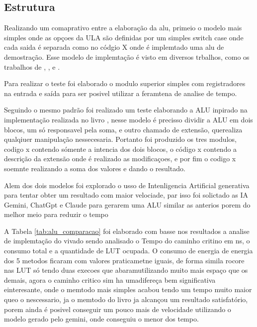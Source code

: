 \subsection{Estrutura}
\label{sub:estrutura}

Realizando um comaprativo entre a elaboração da alu, primeio o modelo mais simples onde as opçoes da ULA são definidas por um simples switch case onde cada saida é separada como no códgio X onde é implemtado uma alu de demostração. Esse modelo de implemtação é visto em diversos trbalhos, como os trabalhos de , ,  e
.

Para realizar o teste foi elaborado o modulo  superior simples com registradores na entrada e saída para ser posivel utilizar a feramtena de analise de tempo.


Seguindo o mesmo padrão foi realizado um teste elaborando a ALU inpirado na implementação realizada no livro , nesse modelo é precisso dividir a ALU em dois blocos, um só responsavel pela soma, e outro chamado de extensão, querealiza qualqiuer manipulação nessecesaria. Portanto foi produzido os tres modulos, codigo x contendo sómente a intencia dos dois blocos, o código x contendo a descrição da extensão onde é realizado as modificaçoes, e por fim o codigo x soemnte realizando a soma dos valores e dando o resultado.





Alem dos dois modelos foi explorado o usso de Intenligencia Artificial generativa para tentar obter um resultado com maior velociade, par isso foi solictado as IA Gemini, ChatGpt e Claude para gerarem uma ALU similar as anterios porem do melhor meio para reduzir o tempo



A Tabela \ref{tab:alu_comparacao} foi elaborado com basse nos resultados a analise de implemtação do vivado sendo analisado o Tempo do caminho critino em ns, o consumo total e a quantidade de LUT ocupada. O consumo de energia de energia dos 5 metodos ficaram com valores praticametne iguais, de forma simila rocore nas LUT só tendo duas execoes que abaramutilizando muito mais espaço que os demais, agora o caminho critico sim ha umadifereça bem significativa  einteresante, onde o memtodo mais simples acabou tendo um tempo muito maior queo o nescessario, ja o memtodo do livro ja alcançou um resultado satisfatório, porem ainda é posivel conseguir um pouco mais de velocidade utilizando o modelo gerado pelo gemini, onde conseguiu o menor dos tempo.



